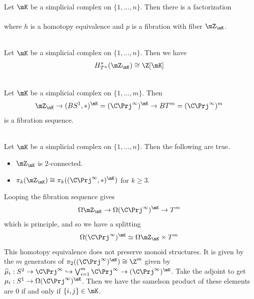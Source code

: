 \documentclass[a4paper]{article}
\begin{document}
\begin{prp}{}{}\\
Let $\mK$ be a simplicial complex on $\{1,\dots,n\}$. Then there is a factorization \\
\\
where $h$ is a homotopy equivalence and $p$ is a fibration with fiber $\mZ_\mK$. 
\end{prp}

\begin{crl}{}{}\\
Let $\mK$ be a simplicial complex on $\{1,\dots,n\}$. Then we have $$H_{T^n}^\ast(\mZ_\mK)\cong\Z[\mK]$$
\end{crl}

\begin{prp}{}{}\\
Let $\mK$ be a simplicial complex on $\{1,\dots,m\}$. Then $$\mZ_\mK\to(BS^1,\ast)^\mK=(\C\Prj^\infty)^\mK\to BT^m=(\C\Prj^\infty)^m$$ is a fibration sequence. 
\end{prp}

\begin{prp}{}{}\\
Let $\mK$ be a simplicial complex on $\{1,\dots,n\}$. Then the following are true. 
\begin{itemize}
\item $\mZ_\mK$ is $2$-connected. 
\item $\pi_k(\mZ_\mK)\cong\pi_k((\C\Prj^\infty,\ast)^\mK)$ for $k\geq 3$. 
\end{itemize}
\end{prp}

Looping the fibration sequence gives $$\Omega\mZ_\mK\to\Omega(\C\Prj^\infty)^\mK\to T^m$$ which is principle, and so we have a splitting $$\Omega(\C\Prj^\infty)^\mK\simeq\Omega\mZ_\mK\times T^m$$ This homotopy equivalence does not preserve monoid structures. It is given by the $m$ generators of $\pi_2((\C\Prj^\infty)^\mK)\cong\Z^m$ given by $\widehat{\mu}_i:S^2\to\C\Prj^\infty\hookrightarrow\bigvee_{i=1}^m\C\Prj^\infty\to(\C\Prj^\infty)^\mK$. Take the adjoint to get $\mu_i:S^1\to\Omega(\C\Prj^\infty)^\mK$. Then we have the samelson product of these elements are $0$ if and only if $\{i,j\}\in\mK$. 
\end{document}
